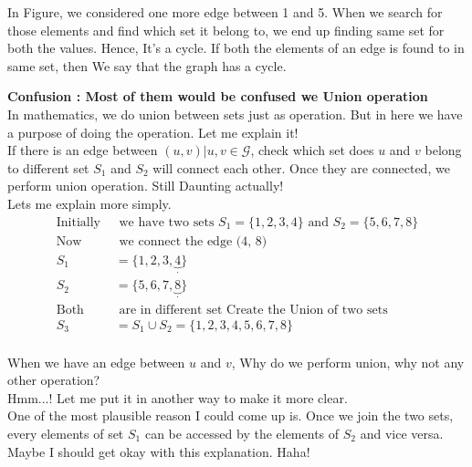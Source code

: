 \documentclass{article}
\begin{document}
In Figure, we considered one more edge between 1 and 5. When we search for those elements and find which set it belong to, we end up finding same set for both the values. Hence, It's a cycle. If both the elements of an edge is found to in same set, then We say that the graph has a cycle.


\textbf{Confusion : Most of them would be confused we Union operation}\\
In mathematics, we do union between sets just as operation. But in here we have a purpose of doing the operation. Let me explain it!\\
If there is an edge between $(u, v)  |  u, v \in \mathcal{G}$, check which set does $u$ and $v$ belong to different set $S_1$ and $S_2$ will connect each other. Once they are connected, we perform union operation. Still Daunting actually!\\
Lets me explain more simply.\\
\begin{align*}
    \text{Initially }&\text{ we have two sets } S_1 = \{1, 2, 3, 4\} \text{ and } S_2 = \{5, 6, 7, 8\} \\
    \text{Now }&\text{ we connect the  edge (4, 8)} \\
    S_1 &= \{ 1, 2, 3, \underbrace{4}_{\cdot} \} \\
    S_2 &= \{ 5, 6, 7, \underbrace{8}_{\cdot} \} \\
    \text{Both}&\text{ are in different set Create the Union of two sets}\\
    S_3 &= S_1 \cup S_2 = \{1, 2, 3, 4, 5, 6, 7, 8 \} \\
\end{align*}

When we have an edge between $u$ and $v$, Why do we perform union, why not any other operation?\\
Hmm...! Let me put it in another way to make it more clear.\\
One of the most plausible reason I could come up is. Once we join the two sets, every elements of set $S_1$ can be accessed by the elements of $S_2$ and vice versa. Maybe I should get okay with this explanation. Haha!
\end{document}
